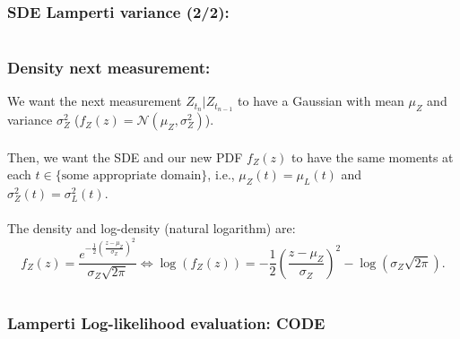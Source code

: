 \documentclass[aspectratio=169]{beamer}\usepackage[utf8]{inputenc}
\begin{document}
\begin{frame}\frametitle{SDE Lamperti variance (2/2):}

\begin{center}
\begin{tabular}{|c|}
\toprule
{\tiny

}\\
\bottomrule
\end{tabular}
\end{center}

\end{frame}


\begin{frame}\frametitle{Density next measurement:}\label{lamp_LH}

We want the next measurement $Z_{t_n}|Z_{t_{n-1}}$ to have a Gaussian with mean $\mu_Z$ and variance $\sigma_Z^2$ ($f_Z(z)=\mathcal{N}(\mu_Z,\sigma^2_Z)$).\\
\quad\\
Then, we want the SDE and our new PDF $f_Z(z)$ to have the same moments at each $t\in\{\text{some appropriate domain}\}$, i.e., $\mu_Z(t)=\mu_L(t)$ and $\sigma^2_Z(t)=\sigma^2_L(t)$.\\
\quad\\
The density and log-density (natural logarithm) are:
\begin{equation*}
f_Z(z)=\frac{e^{-\frac{1}{2}\left(\frac{z-\mu_Z}{\sigma_Z}\right)^2}}{\sigma_Z\sqrt{2\pi}}\iff \log(f_Z(z))=-\frac{1}{2}\left(\frac{z-\mu_Z}{\sigma_Z}\right)^2-\log(\sigma_Z\sqrt{2\pi}).
\end{equation*}

\begin{center}
\begin{tabular}{|c|}
\toprule
{\tiny

}\\
\bottomrule
\end{tabular}
\end{center}

\end{frame}


\begin{frame}\frametitle{Lamperti Log-likelihood evaluation: CODE}

\begin{center}
\begin{tabular}{|c|}
\toprule
{\tiny

}\\
\bottomrule
\end{tabular}
\end{center}

\end{frame}
\end{document}
